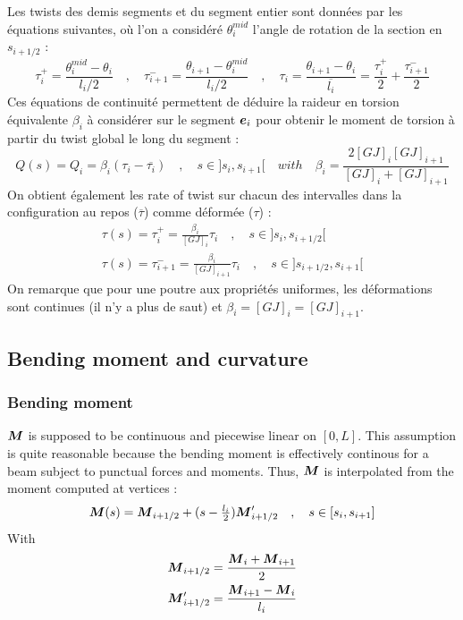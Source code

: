 Les twists des demis segments et du segment entier sont données par les équations suivantes, où l'on a considéré $\theta_i^{mid}$ l'angle de rotation de la section en $s_{i+1/2}$ :
\begin{equation}
	\tau_{i}^{+} = \frac{\theta_i^{mid} - \theta_i}{l_i/2} \quad , \quad
	\tau_{i+1}^{-} = \frac{\theta_{i+1} - \theta_i^{mid}}{l_i/2} \quad , \quad
	\tau_i = \frac{\theta_{i+1}-\theta_{i}}{\overbar{l_i}} = \frac{\tau_{i}^{+}}{2} + \frac{\tau_{i+1}^{-}}{2}
\end{equation}
Ces équations de continuité permettent de déduire la raideur en torsion équivalente $\beta_i$ à considérer sur le segment $\boldsymbol{e}_i$ pour obtenir le moment de torsion à partir du twist global le long du segment :
 \begin{equation}
	Q(s) = Q_i = \beta_i(\tau_i - \overbar{\tau_i}) \quad , \quad s \in ]s_i,s_{i+1}[
	\quad with \quad \beta_i = \frac{2 [GJ]_i [GJ]_{i+1}}{[GJ]_i + [GJ]_{i+1}}
\end{equation}
On obtient également les rate of twist sur chacun des intervalles dans la configuration au repos ($\overbar{\tau}$) comme déformée ($\tau$) :
\begin{subequations}
	\begin{gather}
		\tau(s) = \tau_{i}^{+} = \frac{\beta_i}{[GJ]_i}\tau_i \quad , \quad s \in ]s_i,s_{i+1/2}[ \\
		\tau(s) = \tau_{i+1}^{-} = \frac{\beta_i}{[GJ]_{i+1}}\tau_i \quad , \quad s \in ]s_{i+1/2},s_{i+1}[
	\end{gather}
\end{subequations}
On remarque que pour une poutre aux propriétés uniformes, les déformations sont continues (il n'y a plus de saut) et $\beta_i = [GJ]_i = [GJ]_{i+1}$.

\subsection{Bending moment and curvature}

\subsubsection{Bending moment}
$\boldsymbol{M}$ is supposed to be continuous and piecewise linear on $[0,L]$. This assumption is quite reasonable because the bending moment is effectively continous for a beam subject to punctual forces and moments. Thus, $\boldsymbol{M}$ is interpolated from the moment computed at vertices :
\begin{equation}
	\boldsymbol{M}(s) = \boldsymbol{M}_{i+1/2} + (s-\tfrac{l_i}{2}) \boldsymbol{M}'_{i+1/2} \quad , \quad s \in [s_i,s_{i+1}]
\end{equation}
With
\begin{subequations}
	\begin{gather}
	\boldsymbol{M}_{i+1/2} = \frac{\boldsymbol{M}_{i} + \boldsymbol{M}_{i+1}}{2} \\
	\boldsymbol{M}'_{i+1/2} = \frac{\boldsymbol{M}_{i+1} - \boldsymbol{M}_{i}}{l_i}
	\end{gather}
\end{subequations}

